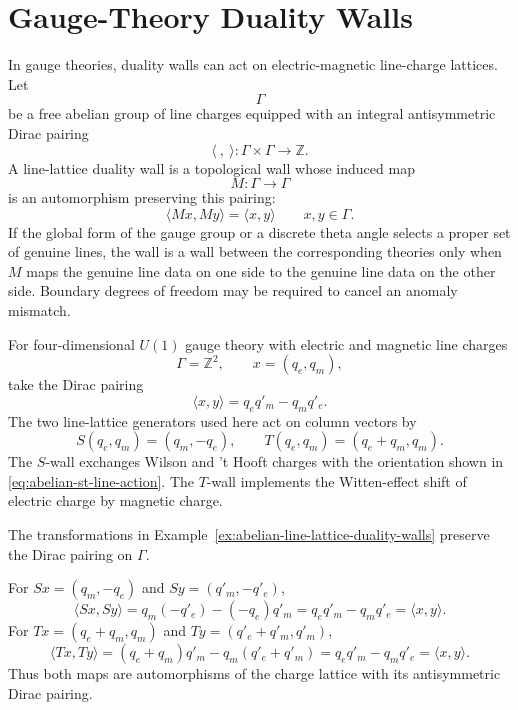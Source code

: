\section{Gauge-Theory Duality Walls}

In gauge theories, duality walls can act on electric-magnetic line-charge
lattices.  Let
\[
  \Gamma
\]
be a free abelian group of line charges equipped with an integral
antisymmetric Dirac pairing
\[
  \langle\ ,\ \rangle:\Gamma\times\Gamma\to\mathbb Z.
\]
A line-lattice duality wall is a topological wall whose induced map
\[
  M:\Gamma\longrightarrow\Gamma
\]
is an automorphism preserving this pairing:
\begin{equation}
  \langle Mx,My\rangle=\langle x,y\rangle
  \qquad x,y\in\Gamma.
  \label{eq:line-lattice-symplectic-condition}
\end{equation}
If the global form of the gauge group or a discrete theta angle selects a
proper set of genuine lines, the wall is a wall between the corresponding
theories only when \(M\) maps the genuine line data on one side to the genuine
line data on the other side.  Boundary degrees of freedom may be required to
cancel an anomaly mismatch.

\begin{example}
\label{ex:abelian-line-lattice-duality-walls}
For four-dimensional \(U(1)\) gauge theory with electric and magnetic line
charges
\[
  \Gamma=\mathbb Z^2,
  \qquad
  x=(q_e,q_m),
\]
take the Dirac pairing
\[
  \langle x,y\rangle=q_e q'_m-q_m q'_e .
\]
The two line-lattice generators used here act on column vectors by
\begin{equation}
  S(q_e,q_m)=(q_m,-q_e),
  \qquad
  T(q_e,q_m)=(q_e+q_m,q_m).
  \label{eq:abelian-st-line-action}
\end{equation}
The \(S\)-wall exchanges Wilson and 't Hooft charges with the orientation
shown in \eqref{eq:abelian-st-line-action}.  The \(T\)-wall implements the
Witten-effect shift of electric charge by magnetic charge.
\end{example}

\begin{remark}
\label{rem:st-walls-preserve-dirac-pairing}
The transformations in Example~\ref{ex:abelian-line-lattice-duality-walls}
preserve the Dirac pairing on \(\Gamma\).

For \(Sx=(q_m,-q_e)\) and \(Sy=(q'_m,-q'_e)\),
\[
  \langle Sx,Sy\rangle
  =
  q_m(-q'_e)-(-q_e)q'_m
  =
  q_e q'_m-q_m q'_e
  =
  \langle x,y\rangle .
\]
For \(Tx=(q_e+q_m,q_m)\) and \(Ty=(q'_e+q'_m,q'_m)\),
\[
  \langle Tx,Ty\rangle
  =
  (q_e+q_m)q'_m-q_m(q'_e+q'_m)
  =
  q_e q'_m-q_m q'_e
  =
  \langle x,y\rangle .
\]
Thus both maps are automorphisms of the charge lattice with its
antisymmetric Dirac pairing.
\end{remark}

